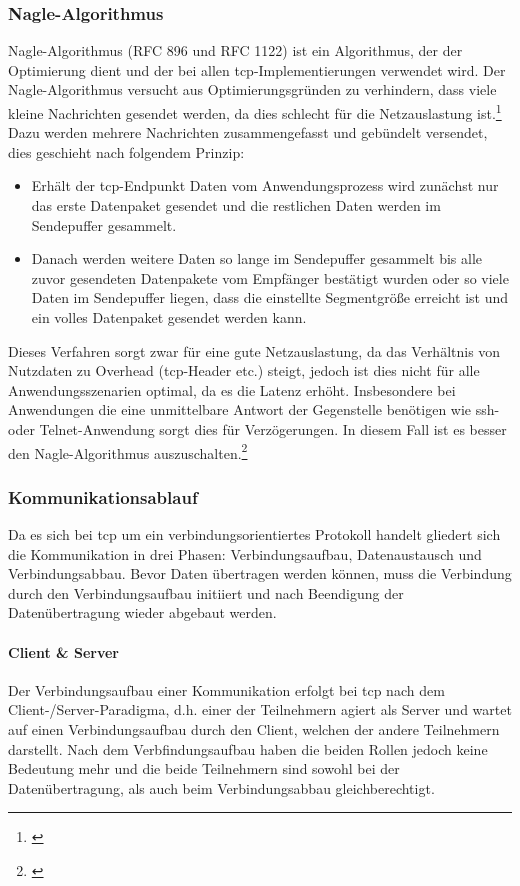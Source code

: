 \subsubsection{Nagle-Algorithmus}\label{nagle}
Nagle-Algorithmus (RFC 896 und RFC 1122) ist ein Algorithmus, der der Optimierung dient und der bei allen \gls{tcp}-Implementierungen verwendet wird. Der Nagle-Algorithmus versucht aus Optimierungsgründen zu verhindern, dass viele kleine Nachrichten gesendet werden, da dies schlecht für die Netzauslastung ist.\footnote{\citep[vgl.][Grundkurs Datenkommunikation, Seite 198]{Mandl.GrundkursDatenkommunikation}\label{note45}} \newline
Dazu werden mehrere Nachrichten zusammengefasst und gebündelt versendet, dies geschieht nach folgendem Prinzip:
\begin{itemize}
	\item{Erhält der \gls{tcp}-Endpunkt Daten vom Anwendungsprozess wird zunächst nur das erste Datenpaket gesendet und die restlichen Daten werden im Sendepuffer gesammelt.}
	\item{Danach werden weitere Daten so lange im Sendepuffer gesammelt bis alle zuvor gesendeten Datenpakete vom Empfänger bestätigt wurden oder so viele Daten im Sendepuffer liegen, dass die einstellte Segmentgröße erreicht ist und ein volles Datenpaket gesendet werden kann.}
\end{itemize}
Dieses Verfahren sorgt zwar für eine gute Netzauslastung, da das Verhältnis von Nutzdaten zu Overhead (\gls{tcp}-Header etc.) steigt, jedoch ist dies nicht für alle Anwendungsszenarien optimal, da es die Latenz erhöht. Insbesondere bei Anwendungen die eine unmittelbare Antwort der Gegenstelle benötigen wie \gls{ssh}- oder Telnet-Anwendung sorgt dies für Verzögerungen. In diesem Fall ist es besser den Nagle-Algorithmus auszuschalten.\footnote{\citep[vgl.][Grundkurs Datenkommunikation, Seite 198 f.]{Mandl.GrundkursDatenkommunikation}\label{note65}}
\subsubsection{Kommunikationsablauf}
Da es sich bei \gls{tcp} um ein verbindungsorientiertes Protokoll handelt gliedert sich die Kommunikation in drei Phasen: Verbindungsaufbau, Datenaustausch und Verbindungsabbau. Bevor Daten übertragen werden können, muss die Verbindung durch den Verbindungsaufbau initiiert und nach Beendigung der Datenübertragung wieder abgebaut werden. 
\paragraph{Client \& Server}
Der Verbindungsaufbau einer Kommunikation erfolgt bei \gls{tcp} nach dem Client-/Server-Paradigma, d.h. einer der Teilnehmern agiert als Server und wartet auf einen Verbindungsaufbau durch den Client, welchen der andere Teilnehmern darstellt. \newline
Nach dem Verbfindungsaufbau haben die beiden Rollen jedoch keine Bedeutung mehr und die beide Teilnehmern sind sowohl bei der Datenübertragung, als auch beim Verbindungsabbau gleichberechtigt.
